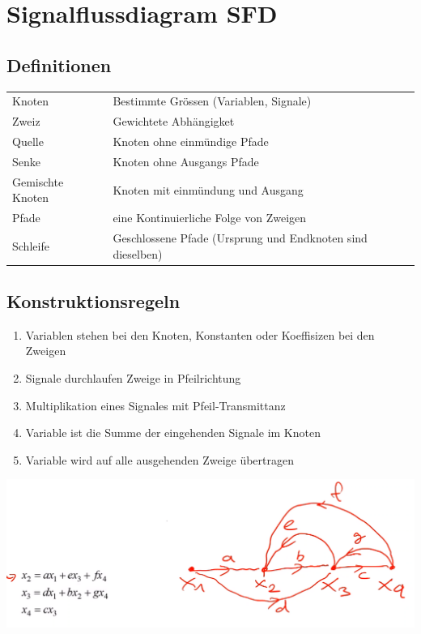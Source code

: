 \section{Signalflussdiagram SFD}
\subsection{Definitionen}
\begin{table}[H]
	\begin{tabular}{l|l}
		Knoten & Bestimmte Grössen (Variablen, Signale) \\
		Zweiz & Gewichtete Abhängigket \\
		Quelle & Knoten ohne einmündige Pfade \\
		Senke & Knoten ohne Ausgangs Pfade \\
		Gemischte Knoten & Knoten mit einmündung und Ausgang \\
		Pfade & eine Kontinuierliche Folge von Zweigen \\
		Schleife & Geschlossene Pfade (Ursprung und Endknoten sind dieselben)
	\end{tabular}
\end{table}

\subsection{Konstruktionsregeln}
\begin{enumerate}[nosep]
	\item Variablen stehen bei den Knoten, Konstanten oder Koeffisizen bei den Zweigen
	\item Signale durchlaufen Zweige in Pfeilrichtung
	\item Multiplikation eines Signales mit Pfeil-Transmittanz
	\item Variable ist die Summe der eingehenden Signale im Knoten
	\item Variable wird auf alle ausgehenden Zweige übertragen
\end{enumerate}
\includegraphics[width=\linewidth]{Images/sfd}

